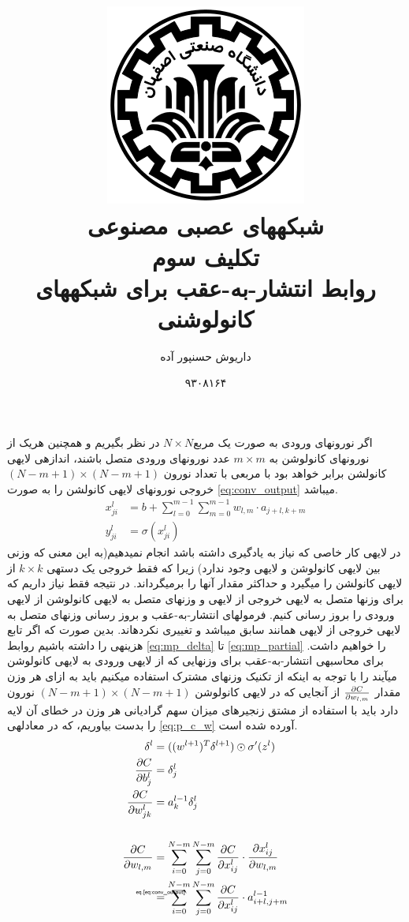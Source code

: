 \documentclass[10pt,a4paper]{article}
\newcommand{\نیمفاصله}{\halfspace}
\renewcommand{\ }{\halfspace}
\newcommand{\ان}{\lr{N}}
\newcommand{\p}[2]{{\partial #1 \over \partial #2}}
\newcommand\teq[1]{\mathrel{\overset{\makebox[0pt]{\mbox{\normalfont\tiny\sffamily #1}}}{=}}}
\begin{document}
\title{
    \includegraphics[width=.2\textwidth]{iut}\\
شبکه\ های عصبی مصنوعی\\تکلیف سوم\\
روابط انتشار-به-عقب برای شبکه\ های کانولوشنی
}
\author{داریوش حسن\ پور آده}
\date{۹۳۰۸۱۶۴}
\maketitle
اگر نورون\ های ورودی به صورت یک مربع$N \times N$ در نظر بگیریم و همچنین هریک از نورون\ های کانولوشن به $m \times m$ عدد نورون\ های ورودی متصل باشند، اندازه\ ی لایه\ ی کانولشن برابر خواهد بود با مربعی با تعداد نورون
$(N - m + 1) \times (N - m + 1)$
خروجی نورون\ های لایه\ ی کانولشن را به صورت
\ref{eq:conv_output}
می\ باشد.
\begin{align}
x_{ji}^l &= b + \sum_{l = 0}^{m - 1}\sum_{m = 0}^{m - 1}w_{l,m}\cdot a_{j+l,k+m}\\
y_{ji}^l &= \sigma(x_{ji}^l)\label{eq:conv_output}
\end{align}
در لایه\ ی  کار خاصی که نیاز به یادگیری داشته باشد انجام نمی\ دهیم(به این معنی که وزنی بین لایه\ ی کانولوشن و لایه\ ی  وجود ندارد) زیرا که فقط خروجی یک دسته\ ی $k \times k$ از لایه\ ی کانولشن را می\ گیرد و حداکثر مقدار آن\ ها را برمی\ گرداند. در نتیجه فقط نیاز داریم که برای وزن\ ها متصل به لایه\ ی خروجی از لایه\ ی  و وزن\ های متصل به لایه\ ی کانولوشن از لایه\ ی ورودی را بروز رسانی کنیم.
فرمول\ های انتشار-به-عقب و بروز رسانی وزن\ های متصل به لایه\ ی خروجی از لایه\ ی  همانند سابق می\ باشد و تغییری نکرده\ اند. بدین صورت که اگر تابع هزینه\ ی  را داشته باشیم روابط
\ref{eq:mp_delta} تا \ref{eq:mp_partial}
را خواهیم داشت. برای محاسبه\ ی انتشار-به-عقب برای وزن\ هایی که از لایه\ ی ورودی به لایه\ ی کانولوشن می\ آیند را با توجه به اینکه از تکنیک وزن\ های مشترک استفاده می\ کنیم باید به ازای هر وزن مقدار
$\p{C}{w_{l,m}}$
 از آنجایی که در لایه\ ی کانولوشن
$(N - m + 1) \times (N - m + 1)$
نورون دارد باید با استفاده از مشتق زنجیره\ ای میزان سهم گرادیانی هر وزن در خطای آن لایه را بدست بیاوریم، که در معادله\ ی
\ref{eq:p_c_w}
آورده شده است.
\begin{align}
\delta^l &=   ((w^{l+1})^T\delta^{l+1}) \odot \sigma^\prime(z^l)\label{eq:mp_delta}\\
\p{C}{b_j^l} &= \delta_j^l\\
\p{C}{w_{jk}^l} &= a_k^{l - 1}\delta_j^l\label{eq:mp_partial}\\\\
{\partial C \over \partial w_{l,m}} 
&= \sum_{i = 0}^{N - m}\sum_{j = 0}^{N - m} \p{C}{x_{ij}^l}\cdot\p{x_{ij}^l}{w_{l,m}}\nonumber\\
&\teq{eq.\ref{eq:conv_output}} \sum_{i = 0}^{N - m}\sum_{j = 0}^{N - m} \p{C}{x_{ij}^l}\cdot a_{i+l,j+m}^{l-1}\label{eq:p_c_w}
\end{align}
\end{document}
